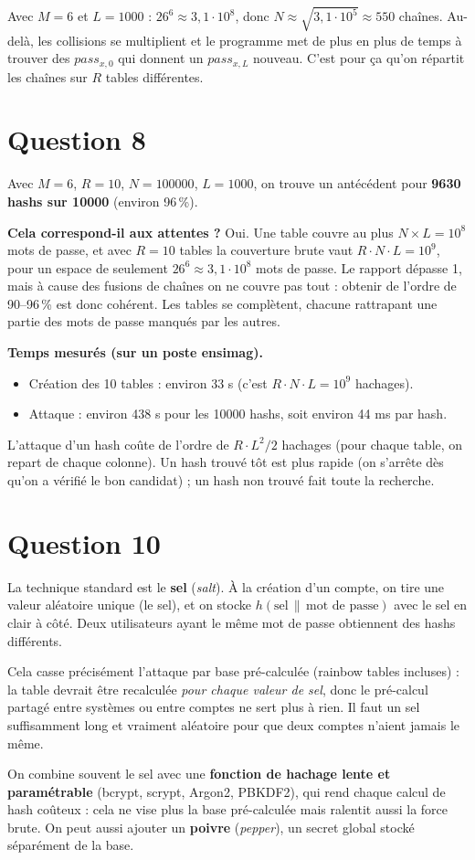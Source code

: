 \documentclass{article}
\begin{document}
Avec $M = 6$ et $L = 1000$ : $26^6 \approx 3{,}1 \cdot 10^8$, donc $N \approx \sqrt{3{,}1 \cdot 10^5} \approx 550$ chaînes. Au-delà, les collisions se multiplient et le programme met de plus en plus de temps à trouver des $pass_{x,0}$ qui donnent un $pass_{x,L}$ nouveau. C'est pour ça qu'on répartit les chaînes sur $R$ tables différentes.

\section*{Question 8}

Avec $M=6$, $R=10$, $N=100000$, $L=1000$, on trouve un antécédent pour
\textbf{9630 hashs sur 10000} (environ 96\,\%).

\textbf{Cela correspond-il aux attentes ?} Oui. Une table couvre au plus
$N \times L = 10^8$ mots de passe, et avec $R = 10$ tables la couverture brute vaut
$R \cdot N \cdot L = 10^9$, pour un espace de seulement $26^6 \approx 3{,}1 \cdot 10^8$
mots de passe. Le rapport dépasse 1, mais à cause des fusions de chaînes on ne couvre
pas tout : obtenir de l'ordre de 90--96\,\% est donc cohérent. Les tables se complètent,
chacune rattrapant une partie des mots de passe manqués par les autres.

\textbf{Temps mesurés (sur un poste ensimag).}
\begin{itemize}
  \item Création des 10 tables : environ 33 s (c'est $R \cdot N \cdot L = 10^9$ hachages).
  \item Attaque : environ 438 s pour les 10000 hashs, soit environ 44 ms par hash.
\end{itemize}
L'attaque d'un hash coûte de l'ordre de $R \cdot L^2 / 2$ hachages (pour chaque table,
on repart de chaque colonne). Un hash trouvé tôt est plus rapide (on s'arrête dès qu'on
a vérifié le bon candidat) ; un hash non trouvé fait toute la recherche.

\section*{Question 10}

La technique standard est le \textbf{sel} (\emph{salt}). À la création d'un compte, on
tire une valeur aléatoire unique (le sel), et on stocke $h(\text{sel} \, \| \, \text{mot de passe})$
avec le sel en clair à côté. Deux utilisateurs ayant le même mot de passe obtiennent des
hashs différents.

Cela casse précisément l'attaque par base pré-calculée (rainbow tables incluses) : la table
devrait être recalculée \emph{pour chaque valeur de sel}, donc le pré-calcul partagé entre
systèmes ou entre comptes ne sert plus à rien. Il faut un sel suffisamment long et vraiment
aléatoire pour que deux comptes n'aient jamais le même.

On combine souvent le sel avec une \textbf{fonction de hachage lente et paramétrable}
(bcrypt, scrypt, Argon2, PBKDF2), qui rend chaque calcul de hash coûteux : cela ne vise plus
la base pré-calculée mais ralentit aussi la force brute. On peut aussi ajouter un
\textbf{poivre} (\emph{pepper}), un secret global stocké séparément de la base.
\end{document}
